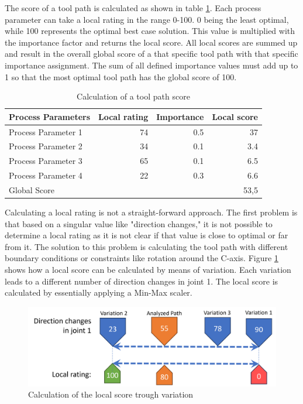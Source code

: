 The score of a tool path is calculated as shown in table \ref{weighting}. Each process parameter can take a local rating in the range 0-100. 0 being the least optimal, while 100 represents the optimal best case solution. This value is multiplied with the importance factor and returns the local score. 
All local scores are summed up and result in the overall global score of a that specific tool path with that specific importance assignment.
The sum of all defined importance values must add up to 1 so that the most optimal tool path has the global score of 100.


\begin{table}[H]
	\centering
	\begin{tabular}{||l|r|r|r||}
		Process Parameters & Local rating & Importance & Local score\\
		\hline
		\hline
		\hline
		
		Process Parameter 1 & 74 & 0.5 & 37\\
		Process Parameter 2 & 34& 0.1&3.4\\
		Process Parameter 3& 65& 0.1&6.5\\
		Process Parameter 4& 22&0.3&6.6\\
		\hline
		\hline
		\hline
		Global Score& & &53,5\\
		\hline
		\hline
	\end{tabular}
	
	\caption{Calculation of a tool path score}
	\label{weighting}
\end{table}

Calculating a local rating is not a straight-forward approach. The first problem is that based on a singular value like "direction changes," it is not possible to determine a local rating as it is not clear if that value is close to optimal or far from it.
The solution to this problem is calculating the tool path with different boundary conditions or constraints like rotation around the C-axis.
Figure \ref{Localscore} shows how a local score can be calculated by means of variation. Each variation leads to a different number of direction changes in joint 1. The local score is calculated by essentially applying a Min-Max scaler.

\begin{figure}[H]
	\centerline{\includegraphics[scale=.65]{figures/localscore.png}}
	\caption{Calculation of the local score trough variation}
	\label{Localscore}
\end{figure}


